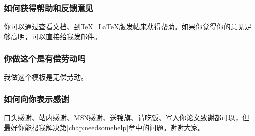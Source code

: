 \subsubsection*{如何获得帮助和反馈意见}
你可以通过查看文档、到TeX\_LaTeX版发帖来获得帮助。如果你觉得你的意见足够高明，可以直接给我\href{mail:wei.jianwen@gmail.com}{发邮件}。

\subsubsection*{你做这个是有偿劳动吗}
我做这个模板是无偿劳动。

\subsubsection*{如何向你表示感谢}
口头感谢、站内感谢、\href{wei.jianwen@gmail.com}{MSN感谢}、送锦旗、请吃饭、写入你论文致谢都可以，但最好你能帮我解决第\ref{chap:needsomehelp}章中的问题。谢谢大家。

